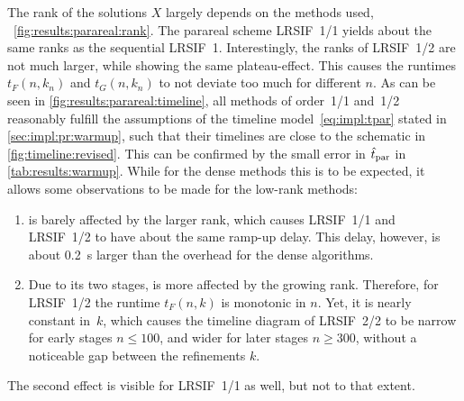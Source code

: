 The rank of the solutions $X$ largely depends on the methods used,
\cf~\autoref{fig:results:parareal:rank}.
The parareal scheme \ac{LRSIF}~1/1 yields about the same ranks as the sequential \ac{LRSIF}~1.
Interestingly, the ranks of \ac{LRSIF}~1/2 are not much larger,
while showing the same plateau-effect.
This causes the runtimes $t_F(n, k_n)$ and $t_G(n, k_n)$ to not deviate too much for different $n$.
As can be seen in \autoref{fig:results:parareal:timeline},
all methods of order~1/1 and~1/2
reasonably fulfill the assumptions of the timeline model~\eqref{eq:impl:tpar} stated in \autoref{sec:impl:pr:warmup},
such that their timelines are close to the schematic in \autoref{fig:timeline:revised}.
This can be confirmed by the small error in $\hat t_\text{par}$ in \autoref{tab:results:warmup}.
While for the dense methods this is to be expected,
it allows some observations to be made for the low-rank methods:
\begin{enumerate}
  \item
     is barely affected by the larger rank,
    which causes \ac{LRSIF}~1/1 and \ac{LRSIF}~1/2 to have about the same ramp-up delay.
    This delay, however, is about \SI[round-precision=1]{0.2}{\second} larger than the overhead for the dense algorithms.
  \item
    Due to its two stages,  is more affected by the growing rank.
    Therefore, for \ac{LRSIF}~1/2 the runtime $t_F(n, k)$ is monotonic in $n$.
    Yet, it is nearly constant in~$k$,
    which causes the timeline diagram of \ac{LRSIF}~2/2
    to be narrow for early stages $n \leq 100$,
    and wider for later stages $n \geq 300$,
    without a noticeable gap between the refinements $k$.
\end{enumerate}
The second effect is visible for \ac{LRSIF}~1/1 as well, but not to that extent.

